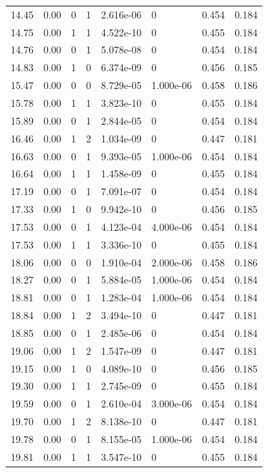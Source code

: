 \documentclass[preview]{standalone}
\begin{document}
{{{\begin{tabular}{L{1.2cm}C{1.2cm} C{0.3cm}C{0.5cm} C{1.4cm}C{1.4cm} C{1.4cm}C{1.4cm}}
  14.45  &  0.00  & 0     &  1 &  2.616e-06  & 0  & 0.454 &  0.184   \\ 
  14.75  &  0.00  & 1     &  1 &  4.522e-10  & 0  & 0.455 &  0.184   \\ 
  14.76  &  0.00  & 0     &  1 &  5.078e-08  & 0  & 0.454 &  0.184   \\ 
  14.83  &  0.00  & 1     &  0 &  6.374e-09  & 0  & 0.456 &  0.185   \\ 
  15.47  &  0.00  & 0     &  0 &  8.729e-05  & 1.000e-06  & 0.458 &  0.186   \\ 
  15.78  &  0.00  & 1     &  1 &  3.823e-10  & 0  & 0.455 &  0.184   \\ 
  15.89  &  0.00  & 0     &  1 &  2.844e-05  & 0  & 0.454 &  0.184   \\ 
  16.46  &  0.00  & 1     &  2 &  1.034e-09  & 0  & 0.447 &  0.181   \\ 
  16.63  &  0.00  & 0     &  1 &  9.393e-05  & 1.000e-06  & 0.454 &  0.184   \\ 
  16.64  &  0.00  & 1     &  1 &  1.458e-09  & 0  & 0.455 &  0.184   \\ 
  17.19  &  0.00  & 0     &  1 &  7.091e-07  & 0  & 0.454 &  0.184   \\ 
  17.33  &  0.00  & 1     &  0 &  9.942e-10  & 0  & 0.456 &  0.185   \\ 
  17.53  &  0.00  & 0     &  1 &  4.123e-04  & 4.000e-06  & 0.454 &  0.184   \\ 
  17.53  &  0.00  & 1     &  1 &  3.336e-10  & 0  & 0.455 &  0.184   \\ 
  18.06  &  0.00  & 0     &  0 &  1.910e-04  & 2.000e-06  & 0.458 &  0.186   \\ 
  18.27  &  0.00  & 0     &  1 &  5.884e-05  & 1.000e-06  & 0.454 &  0.184   \\ 
  18.81  &  0.00  & 0     &  1 &  1.283e-04  & 1.000e-06  & 0.454 &  0.184   \\ 
  18.84  &  0.00  & 1     &  2 &  3.494e-10  & 0  & 0.447 &  0.181   \\ 
  18.85  &  0.00  & 0     &  1 &  2.485e-06  & 0  & 0.454 &  0.184   \\ 
  19.06  &  0.00  & 1     &  2 &  1.547e-09  & 0  & 0.447 &  0.181   \\ 
  19.15  &  0.00  & 1     &  0 &  4.089e-10  & 0  & 0.456 &  0.185   \\ 
  19.30  &  0.00  & 1     &  1 &  2.745e-09  & 0  & 0.455 &  0.184   \\ 
  19.59  &  0.00  & 0     &  1 &  2.610e-04  & 3.000e-06  & 0.454 &  0.184   \\ 
  19.70  &  0.00  & 1     &  2 &  8.138e-10  & 0  & 0.447 &  0.181   \\ 
  19.78  &  0.00  & 0     &  1 &  8.155e-05  & 1.000e-06  & 0.454 &  0.184   \\ 
  19.81  &  0.00  & 1     &  1 &  3.547e-10  & 0  & 0.455 &  0.184   \\ 
\hline 
\end{tabular} 

}}}
\end{document}
